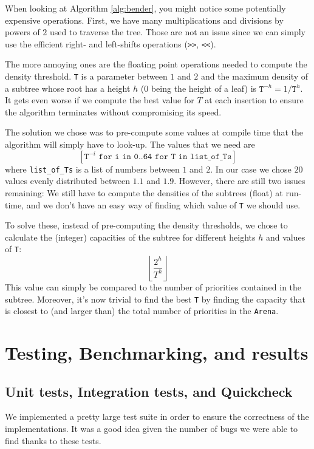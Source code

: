 \documentclass[12pt]{article}
\begin{document}
When looking at Algorithm \ref{alg:bender}, you might notice some potentially expensive operations.
First, we have many multiplications and divisions by powers of $2$ used to traverse the tree. Those are not an issue since we can simply use the efficient right- and left-shifts operations (\texttt{>>}, \texttt{<<}).

The more annoying ones are the floating point operations needed to compute the density threshold.
\texttt{T} is a parameter between $1$ and $2$ and the maximum density of a subtree whose root has a height $h$ ($0$ being the height of a leaf) is $\texttt{T}^{-h} = 1 / \texttt{T}^h$.
It gets even worse if we compute the best value for $T$ at each insertion to ensure the algorithm terminates without compromising its speed.

The solution we chose was to pre-compute some values at compile time that the algorithm will simply have to look-up.
The values that we need are
$$[\texttt{T}^{-i} \texttt{  for i in 0..64  for T in list\_of\_Ts}]$$
where \texttt{list\_of\_Ts} is a list of numbers between $1$ and $2$. In our case we chose $20$ values evenly distributed between $1.1$ and $1.9$.
However, there are still two issues remaining: We still have to compute the densities of the subtrees (float) at run-time, and we don't have an easy way of finding which value of \texttt{T} we should use.

To solve these, instead of pre-computing the density thresholds, we chose to calculate the (integer) capacities of the subtree for different heights $h$ and values of \texttt{T}:
$$ \left\lfloor \frac{2^h}{T^h} \right\rfloor $$
This value can simply be compared to the number of priorities contained in the subtree.
Moreover, it's now trivial to find the best \texttt{T} by finding the capacity that is closest to (and larger than) the total number of priorities in the \texttt{Arena}.


\newpage
\section{Testing, Benchmarking, and results}

\subsection{Unit tests, Integration tests, and Quickcheck}

We implemented a pretty large test suite in order to ensure the correctness of the implementations. It was a good idea given the number of bugs we were able to find thanks to these tests.
\end{document}
